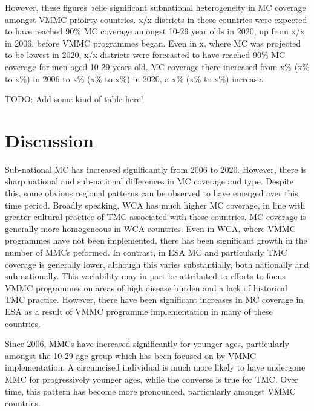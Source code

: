 \documentclass{article}
\begin{document}
However, these figures belie significant subnational heterogeneity in MC coverage amongst VMMC prioirty countries. 
x/x districts in these countries were expected to have reached 90\% MC coverage amongst 10-29 year olds in 2020, up from x/x in 2006, before VMMC programmes began. 
Even in x, where MC was projected to be lowest in 2020, x/x districts were forecasted to have reached 90\% MC coverage for men aged 10-29 years old. 
MC coverage there increased from x\% (x\% to x\%) in 2006 to x\% (x\% to x\%) in 2020, a x\% (x\% to x\%) increase. 

TODO: Add some kind of table here!

% 

\section{Discussion}
\label{sec:orgca35e01}

Sub-national MC has increased significantly from 2006 to 2020. 
However, there is sharp national and sub-national differences in MC coverage and type. 
Despite this, some obvious regional patterns can be observed to have emerged over this time period. 
Broadly speaking, WCA has much higher MC coverage, in line with greater cultural practice of TMC associated with these countries. 
MC coverage is generally more homogeneous in WCA countries. 
Even in WCA, where VMMC programmes have not been implemented, there has been significant growth in the number of MMCs peformed. 
In contrast, in ESA MC and particularly TMC coverage is generally lower, although this varies substantially, both nationally and sub-nationally. 
This variability may in part be attributed to efforts to focus VMMC programmes on areas of high disease burden and a lack of historical TMC practice. 
However, there have been significant increases in MC coverage in ESA as a result of VMMC programme implementation in many of these countries.

Since 2006, MMCs have increased significantly for younger ages, particularly amongst the 10-29 age group which has been focused on by VMMC implementation. 
A circumcised individual is much more likely to have undergone MMC for progressively younger ages, while the converse is true for TMC.
Over time, this pattern has become more pronounced, particularly amongst VMMC countries. 
\end{document}
